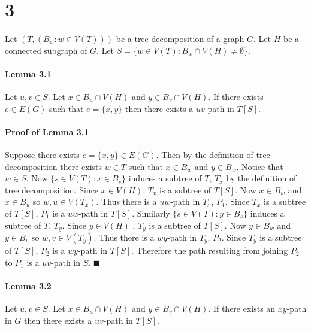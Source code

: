 \documentclass[letterpaper,12pt,oneside,onecolumn]{report}
\begin{document}
\section*{3}
\paragraph{}
Let $(T,(B_w : w\in V(T)))$ be a tree decomposition of a graph $G$. Let $H$ be a connected subgraph of $G$. Let $S = \{w \in V(T) : B_w \cap V(H) \neq \emptyset \}$.
\paragraph{Lemma 3.1}
Let $u, v \in S$. Let $x \in B_u \cap V(H)$ and $y \in B_v \cap V(H)$. If there exists $e \in E(G)$ such that $e = \{x,y\}$ then there exists a $uv$-path in $T[S]$.
\paragraph{Proof of Lemma 3.1}
Suppose there exists $e=\{x,y\} \in E(G)$. Then by the definition of tree decomposition there exists $w \in T$ such that $x \in B_w$ and $y \in B_w$. Notice that $w \in S$. Now $\{ s \in V(T) : x \in B_s \}$ induces a subtree of $T$, $T_x$ by the definition of tree decomposition. Since $x \in V(H)$, $T_x$ is a subtree of $T[S]$. Now $x \in B_w$ and $x \in B_u$ so $w,u \in V(T_x)$. Thus there is a $uw$-path in $T_x$, $P_1$. Since $T_x$ is a subtree of $T[S]$, $P_1$ is a $uw$-path in $T[S]$. Similarly $\{s \in V(T) : y \in B_s \}$ induces a subtree of $T$, $T_y$. Since $y \in V(H)$ , $T_y$ is a subtree of $T[S]$. Now $y \in B_w$ and $y \in B_v$ so $w,v \in V(T_y)$. Thus there is a $wy$-path in $T_y$, $P_2$. Since $T_y$ is a subtree of $T[S]$, $P_2$ is a $wy$-path in $T[S]$. Therefore the path resulting from joining $P_2$ to $P_1$ is a $uv$-path in $S$. $\blacksquare$
\paragraph{Lemma 3.2}
Let $u, v \in S$. Let $x \in B_u \cap V(H)$ and $y \in B_v \cap V(H)$. If there exists an $xy$-path in $G$ then there exists a $uv$-path in $T[S]$.
\end{document}
